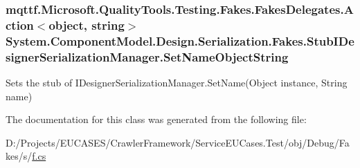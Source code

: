 \hypertarget{class_system_1_1_component_model_1_1_design_1_1_serialization_1_1_fakes_1_1_stub_i_designer_serialization_manager_a4dc8b912ccbec873740e54ec55eb5b39}{
\subsubsection[{Set\-Name\-Object\-String}]{\setlength{\rightskip}{0pt plus 5cm}mqttf.\-Microsoft.\-Quality\-Tools.\-Testing.\-Fakes.\-Fakes\-Delegates.\-Action$<$object, string$>$ System.\-Component\-Model.\-Design.\-Serialization.\-Fakes.\-Stub\-I\-Designer\-Serialization\-Manager.\-Set\-Name\-Object\-String}}\label{class_system_1_1_component_model_1_1_design_1_1_serialization_1_1_fakes_1_1_stub_i_designer_serialization_manager_a4dc8b912ccbec873740e54ec55eb5b39}


Sets the stub of I\-Designer\-Serialization\-Manager.\-Set\-Name(\-Object instance, String name)



The documentation for this class was generated from the following file\-:\begin{DoxyCompactItemize}
\item 
D\-:/\-Projects/\-E\-U\-C\-A\-S\-E\-S/\-Crawler\-Framework/\-Service\-E\-U\-Cases.\-Test/obj/\-Debug/\-Fakes/s/\hyperlink{s_2f_8cs}{f.\-cs}\end{DoxyCompactItemize}
